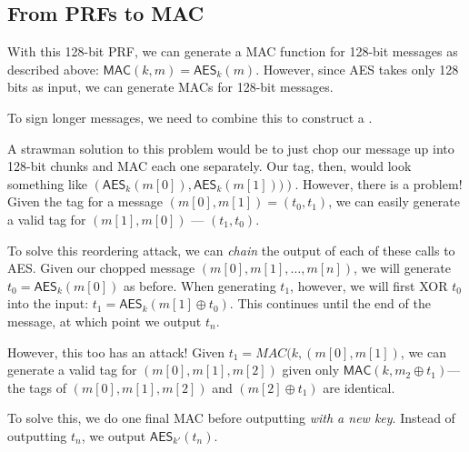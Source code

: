 \subsection{From PRFs to MAC}
With this 128-bit PRF, we can generate a MAC function for 128-bit messages as described above: $\mathsf{MAC}(k, m) = \mathsf{AES}_k(m)$. However, since AES takes only 128 bits as input, we can generate MACs for 128-bit messages. 

To sign longer messages, we need to combine this  to construct a . 

A strawman solution to this problem would be to just chop our message up into 128-bit chunks and MAC each one separately. Our tag, then, would look something like $\left(\mathsf{AES}_k(m[0]), \mathsf{AES}_k(m[1]))\right)$. However, there is a problem! Given the tag for a message $(m[0], m[1]) = (t_0, t_1)$, we can easily generate a valid tag for $(m[1], m[0])$ --- $(t_1, t_0)$. 

To solve this reordering attack, we can \emph{chain} the output of each of these calls to AES. Given our chopped message $(m[0], m[1], \ldots, m[n])$, we will generate $t_0 = \mathsf{AES}_k(m[0])$ as before. When generating $t_1$, however, we will first XOR $t_0$ into the input: $t_1 = \mathsf{AES}_k(m[1] \oplus t_0)$. This continues until the end of the message, at which point we output $t_n$.


However, this too has an attack! Given $t_1 = MAC(k, (m[0], m[1])$, we can generate a valid tag for $(m[0], m[1], m[2])$ given only $\mathsf{MAC}(k, m_2 \oplus t_1)$---the tags of $(m[0], m[1], m[2])$ and $(m[2] \oplus t_1)$ are identical.

	To solve this, we do one final MAC before outputting \emph{with a new key}. Instead of outputting $t_n$, we output $\mathsf{AES}_{k'}(t_n)$. %


